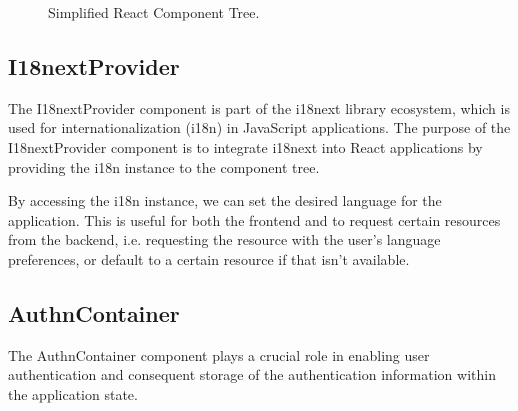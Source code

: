\begin{figure}[h]
	\begin{center}
	\end{center}
	\caption{Simplified React Component Tree.}\label{fig:reactComponentTree}
\end{figure}

\subsection{I18nextProvider}

The I18nextProvider component is part of the i18next library ecosystem, which is used for internationalization (i18n) in JavaScript applications. The purpose of the I18nextProvider component is to integrate i18next into React applications by providing the i18n instance to the component tree.

By accessing the i18n instance, we can set the desired language for the application. This is useful for both the frontend and to request certain resources from the backend, i.e. requesting the resource with the user's language preferences, or default to a certain resource if that isn't available.


\subsection{AuthnContainer}
The AuthnContainer component plays a crucial role in enabling user authentication and consequent storage of the authentication information within the application state.


